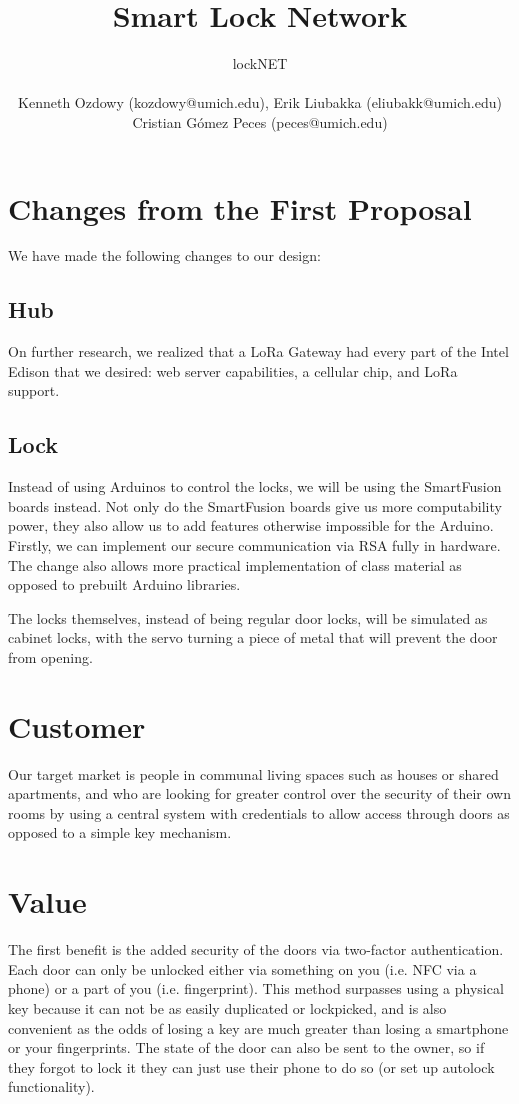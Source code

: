 \documentclass{article}
\title{Smart Lock Network}
\author{
  lockNET \\ \\
  Kenneth Ozdowy (kozdowy@umich.edu), Erik Liubakka (eliubakk@umich.edu) \\
  Cristian G\'{o}mez Peces (peces@umich.edu)
}
\date{}
\begin{document}
\maketitle

\section*{Changes from the First Proposal}

We have made the following changes to our design:


\subsection*{Hub}

On further research, we realized that a LoRa Gateway had every part of the Intel
Edison that we desired: web server capabilities, a cellular chip, and LoRa support. 

\subsection*{Lock}

Instead of using Arduinos to control the locks, we will be using the SmartFusion
boards instead. Not only do the SmartFusion boards give us more computability
power, they also allow us to add features otherwise impossible for the Arduino.
Firstly, we can implement our secure communication via RSA fully in hardware.
The change also allows more practical implementation of class material as opposed to
prebuilt Arduino libraries.

The locks themselves, instead of being regular door locks, will be simulated as
cabinet locks, with the servo turning a piece of metal that will prevent the
door from opening.

\section{Customer}
Our target market is people in communal living spaces such as houses or shared
apartments, and who are looking for greater control over the security of their
own rooms by using a central system with credentials to allow access through
doors as opposed to a simple key mechanism.

\section{Value}

The first benefit is the added security of the doors via two-factor
authentication. Each door can only be unlocked either via something on you (i.e.
NFC via a phone) or a part of you (i.e. fingerprint). This method
surpasses using a physical key because it can not be as easily duplicated or
lockpicked, and is also convenient as the odds of losing a key are much greater
than losing a smartphone or your fingerprints. The state of the door can also be
sent to the owner, so if they forgot to lock it they can just use their phone to
do so (or set up autolock functionality).
\end{document}
